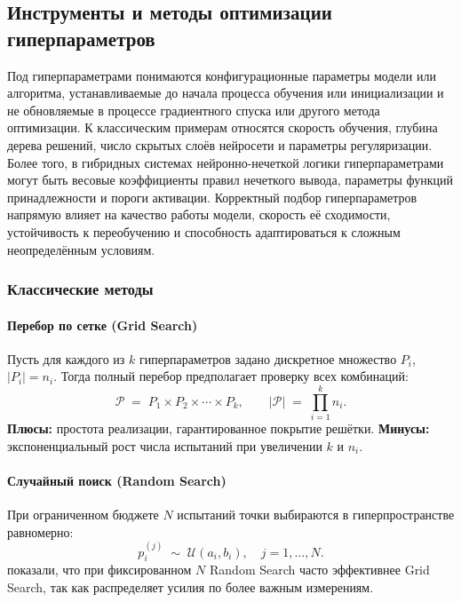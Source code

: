 \subsection{Инструменты и методы оптимизации гиперпараметров}
\label{sec:hyperparameter-optimization}

Под гиперпараметрами понимаются конфигурационные параметры модели или алгоритма, устанавливаемые до начала процесса обучения или инициализации и не обновляемые в процессе градиентного спуска или другого метода оптимизации. К классическим примерам относятся скорость обучения, глубина дерева решений, число скрытых слоёв нейросети и параметры регуляризации. Более того, в гибридных системах нейронно-нечеткой логики гиперпараметрами могут быть весовые коэффициенты правил нечеткого вывода, параметры функций принадлежности и пороги активации. Корректный подбор гиперпараметров напрямую влияет на качество работы модели, скорость её сходимости, устойчивость к переобучению и способность адаптироваться к сложным неопределённым условиям.

\subsubsection{Классические методы}

\paragraph{Перебор по сетке (Grid Search)}  
Пусть для каждого из \(k\) гиперпараметров задано дискретное множество \(P_i\), \(|P_i|=n_i\). Тогда полный перебор предполагает проверку всех комбинаций:
\begin{equation}
\mathcal{P} \;=\; P_1 \times P_2 \times \cdots \times P_k,
\qquad
|\mathcal{P}| \;=\; \prod_{i=1}^k n_i.
\label{eq:grid-search-size}
\end{equation}
\textbf{Плюсы:} простота реализации, гарантированное покрытие решётки.  
\textbf{Минусы:} экспоненциальный рост числа испытаний при увеличении \(k\) и \(n_i\).

\paragraph{Случайный поиск (Random Search)}  
При ограниченном бюджете \(N\) испытаний точки выбираются в гиперпространстве равномерно:
\begin{equation}
p_i^{(j)} \;\sim\; \mathcal{U}(a_i, b_i),
\quad j = 1,\dots,N.
\label{eq:random-search}
\end{equation}
\citet{bergstra2012random} показали, что при фиксированном \(N\) Random Search часто эффективнее Grid Search, так как распределяет усилия по более важным измерениям.

